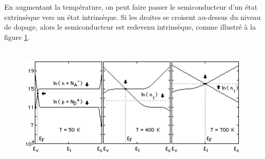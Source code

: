 En augmentant la température, on peut faire passer le semiconducteur d'un état extrinsèque vers un état intrinsèque. Si les droites se croisent au-dessus du niveau de dopage, alors le semiconducteur est redevenu intrinsèque, comme illustré à la figure \ref{intrinseque}.
\begin{figure}[h!] %
\begin{center}
\includegraphics[height=6cm]{intrinseque}
\caption{}
\label{intrinseque}
\end{center}
\end{figure} 
